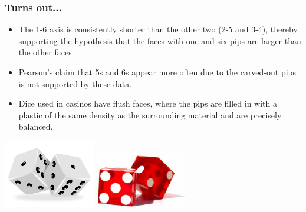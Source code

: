 \begin{frame}
\frametitle{Turns out...}

\begin{itemize}

\item The 1-6 axis is consistently shorter than the other two (2-5 and 3-4), thereby supporting the hypothesis that the faces with one and six pips are larger than the other faces.

\item Pearson's claim that 5s and 6s appear more often due to the carved-out pips is not supported by these data.

\item Dice used in casinos have flush faces, where the pips are filled in with a plastic of the same density as the surrounding material and are precisely balanced.

\end{itemize}

\begin{center}
\includegraphics[width=0.3\textwidth]{6-3_chisq_gof/figures/dice/regular}
\includegraphics[width=0.3\textwidth]{6-3_chisq_gof/figures/dice/casino}
\end{center}


\end{frame}


